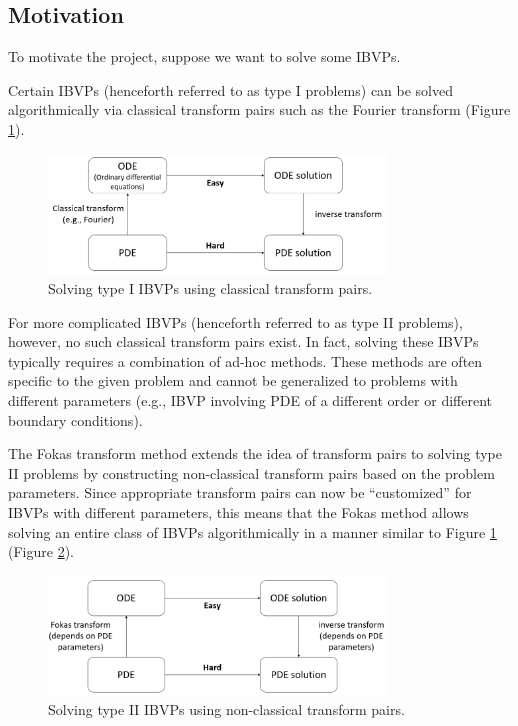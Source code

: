 \documentclass[11pt, oneside, a4paper]{article}
\begin{document}
\subsection{Motivation}
To motivate the project, suppose we want to solve some IBVPs.

Certain IBVPs (henceforth referred to as type I problems) can be solved algorithmically via classical transform pairs such as the Fourier transform (Figure \ref{fig:classical_transform}).
\begin{figure}[htpb!]
    \centering
    \includegraphics[width=0.8\textwidth]{classical_transform.png}
    \caption{Solving type I IBVPs using classical transform pairs.}
    \label{fig:classical_transform}
\end{figure}

For more complicated IBVPs (henceforth referred to as type II problems), however, no such classical transform pairs exist. In fact, solving these IBVPs typically requires a combination of ad-hoc methods. These methods are often specific to the given problem and cannot be generalized to problems with different parameters (e.g., IBVP involving PDE of a different order or different boundary conditions).

The Fokas transform method \cite{Fokas2008} extends the idea of transform pairs to solving type II problems by constructing non-classical transform pairs based on the problem parameters. Since appropriate transform pairs can now be ``customized'' for IBVPs with different parameters, this means that the Fokas method allows solving an entire class of IBVPs algorithmically in a manner similar to Figure \ref{fig:classical_transform} (Figure \ref{fig:non-classical_transform}).
\begin{figure}[htpb!]
    \centering
    \includegraphics[width=0.8\textwidth]{non-classical_transform.png}
    \caption{Solving type II IBVPs using non-classical transform pairs.}
    \label{fig:non-classical_transform}
\end{figure}
\end{document}
